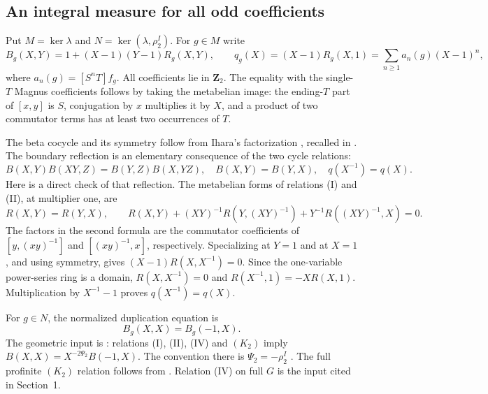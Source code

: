 \subsection{An integral measure for all odd coefficients}
\label{subsec:integral-beta-measure}

Put $M=\ker\lambda$ and $N=\ker(\lambda,\rho_2^I)$.
For $g\in M$ write
\[
 B_g(X,Y)=1+(X-1)(Y-1)R_g(X,Y),\qquad
 q_g(X)=(X-1)R_g(X,1)=\sum_{n\ge1}a_n(g)(X-1)^n,
\]
where $a_n(g)=[S^nT]f_g$.  All coefficients lie in $\mathbf Z_2$.
The equality with the single-$T$ Magnus coefficients follows by taking
the metabelian image: the ending-$T$ part of $[x,y]$ is $S$, conjugation
by $x$ multiplies it by $X$, and a product of two commutator terms has
at least two occurrences of $T$.

The beta cocycle and its symmetry follow from Ihara's factorization
\cite[Proposition~1.6.1]{Ihara1999}, recalled in
\cite[Section~2.3, p.~101]{Furusho2003}. The boundary reflection is
an elementary consequence of the two cycle relations:
\[
 B(X,Y)B(XY,Z)=B(Y,Z)B(X,YZ),\quad B(X,Y)=B(Y,X),
 \quad q(X^{-1})=q(X).
\]
Here is a direct check of that reflection. The metabelian forms of
relations (I) and (II), at multiplier one, are
\[
 R(X,Y)=R(Y,X),\qquad
 R(X,Y)+(XY)^{-1}R(Y,(XY)^{-1})
       +Y^{-1}R((XY)^{-1},X)=0.
\]
The factors in the second formula are the commutator coefficients
of $[y,(xy)^{-1}]$ and $[(xy)^{-1},x]$, respectively.
Specializing at $Y=1$ and at $X=1$, and using symmetry, gives
$(X-1)R(X,X^{-1})=0$. Since the one-variable power-series ring is
a domain, $R(X,X^{-1})=0$ and $R(X^{-1},1)=-XR(X,1)$.
Multiplication by $X^{-1}-1$ proves $q(X^{-1})=q(X)$.

For $g\in N$, the normalized duplication equation is
\begin{equation}
 B_g(X,X)=B_g(-1,X).\label{eq:measure-duplication}
\end{equation}
The geometric input is \cite[Theorem~3.1 and the displayed
$(A_2^0)$, p.~102]{Furusho2003}: relations (I), (II), (IV) and
$(K_2)$ imply $B(X,X)=X^{-2\Psi_2}B(-1,X)$.
The convention there is $\Psi_2=-\rho_2^I$
\cite[p.~100, footnote]{Furusho2003}.
The full profinite $(K_2)$ relation follows from
\cite[Section~8, Theorem~8.1, equation~(50), author p.~30]{Enriquez2007}.
Relation (IV) on full $G$ is the input cited in Section~1.

